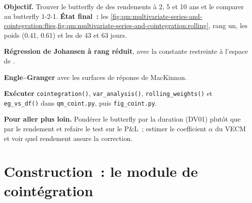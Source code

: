 \begin{tutorial}
\textbf{Objectif.} Trouver le butterfly de  des rendements à 2, 5 et 10 ans et le comparer au butterfly 1-2-1.
\textbf{État final~:} les \cref{fig:qm:multivariate-series-and-cointegration:flies,fig:qm:multivariate-series-and-cointegration:rolling}, rang un, les poids (0.41,
0.61) et les  de 43 et 63 jours.
\begin{tutsteps}
\item \textbf{Régression de Johansen à rang réduit}, avec la constante restreinte à l'espace de .
\label{lst:qm:multivariate-series-and-cointegration:johansen}
\item \textbf{Engle--Granger} avec les surfaces de réponse de MacKinnon.
\label{lst:qm:multivariate-series-and-cointegration:eg}
\item \textbf{Exécuter} \texttt{cointegration()}, \texttt{var\_analysis()}, \texttt{rolling\_weights()} et \texttt{eg\_vs\_df()} dans \texttt{qm\_coint.py}, puis
\texttt{fig\_coint.py}.
\end{tutsteps}
\textbf{Pour aller plus loin.} Pondérer le butterfly par la duration (DV01) plutôt que par le rendement et refaire le test sur le P\&L~; estimer le coefficient $\alpha$ du VECM et voir quel
rendement assure la correction.
\end{tutorial}

\section{Construction~: le module de cointégration}\label{bld:qm:multivariate-series-and-cointegration:coint}

